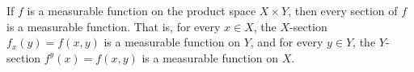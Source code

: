 If $f$ is a measurable function on the product space $X \times Y$, then every section of $f$ is a measurable function. That is, for every $x \in X$, the $X$-section $f_x(y) = f(x,y)$ is a measurable function on $Y$, and for every $y \in Y$, the $Y$-section $f^y(x) = f(x,y)$ is a measurable function on $X$.
